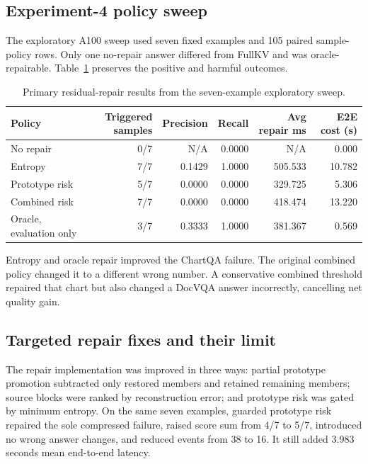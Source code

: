 \documentclass[11pt]{article}
\begin{document}
\subsection{Experiment-4 policy sweep}

The exploratory A100 sweep used seven fixed examples and 105 paired sample-policy rows.  Only one
no-repair answer differed from FullKV and was oracle-repairable.  Table~\ref{tab:repair} preserves
the positive and harmful outcomes.

\begin{table}[ht]
\centering
\small
\caption{Primary residual-repair results from the seven-example exploratory sweep.}
\label{tab:repair}
\begin{tabular}{lrrrrr}
\toprule
Policy & Triggered samples & Precision & Recall & Avg repair ms & E2E cost (s) \\
\midrule
No repair & 0/7 & N/A & 0.0000 & N/A & 0.000 \\
Entropy & 7/7 & 0.1429 & 1.0000 & 505.533 & 10.782 \\
Prototype risk & 5/7 & 0.0000 & 0.0000 & 329.725 & 5.306 \\
Combined risk & 7/7 & 0.0000 & 0.0000 & 418.474 & 13.220 \\
Oracle, evaluation only & 3/7 & 0.3333 & 1.0000 & 381.367 & 0.569 \\
\bottomrule
\end{tabular}
\end{table}

Entropy and oracle repair improved the ChartQA failure.  The original combined policy changed it
to a different wrong number.  A conservative combined threshold repaired that chart but also
changed a DocVQA answer incorrectly, cancelling net quality gain.

\subsection{Targeted repair fixes and their limit}

The repair implementation was improved in three ways: partial prototype promotion subtracted only
restored members and retained remaining members; source blocks were ranked by reconstruction error;
and prototype risk was gated by minimum entropy.  On the same seven examples, guarded prototype
risk repaired the sole compressed failure, raised score sum from 4/7 to 5/7, introduced no wrong
answer changes, and reduced events from 38 to 16.  It still added 3.983 seconds mean end-to-end
latency.
\end{document}
